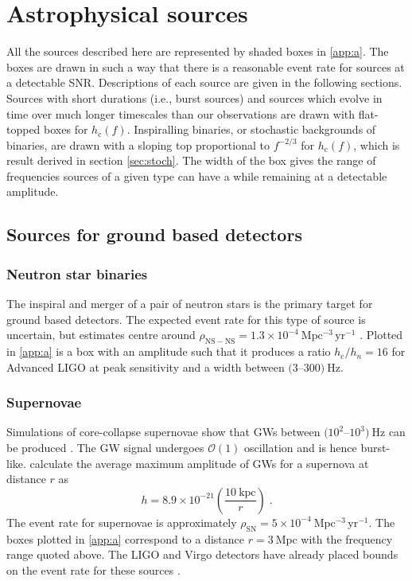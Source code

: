 \section{Astrophysical sources}\label{sec:sources}

All the sources described here are represented by shaded boxes in \ref{app:a}. The boxes are drawn in such a way that there is a reasonable event rate for sources at a detectable SNR. Descriptions of each source are given in the following sections. Sources with short durations (i.e., burst sources) and sources which evolve in time over much longer timescales than our observations are drawn with flat-topped boxes for $h_\mathrm{c}(f)$. Inspiralling binaries, or stochastic backgrounds of binaries, are drawn with a sloping top proportional to $f^{-2/3}$ for $h_\mathrm{c}(f)$, which is result derived in section \ref{sec:stoch}. The width of the box gives the range of frequencies sources of a given type can have a while remaining at a detectable amplitude.

\subsection{Sources for ground based detectors}

\subsubsection{Neutron star binaries}

The inspiral and merger of a pair of neutron stars is the primary target for ground based detectors. The expected event rate for this type of source is uncertain, but estimates centre around $\rho_{\mathrm{NS-NS}}=1.3\times 10^{-4}~\mathrm{Mpc^{-3}\,yr^{-1}}$ \citep{CBC}. Plotted in \ref{app:a} is a box with an amplitude such that it produces a ratio $h_\mathrm{c}/h_{n}=16$ for Advanced LIGO at peak sensitivity and a width between $(3$--$300)~\mathrm{Hz}$.

\subsubsection{Supernovae}

Simulations of core-collapse supernovae show that GWs between $(10^{2}$--$10^{3})~\mathrm{Hz}$ can be produced \citep{Kotake2006}. The GW signal undergoes ${\mathcal{O}}(1)$ oscillation and is hence burst-like. \citet{2002A&A...393..523D} calculate the average maximum amplitude of GWs for a supernova at distance $r$ as
\begin{equation}
h=8.9\times 10^{-21}\left( \frac{10~\mathrm{kpc}}{r} \right) \; .
\end{equation}
The event rate for supernovae is approximately $\rho_{\mathrm{SN}} = 5\times10^{-4}~\mathrm{Mpc^{-3}\,yr^{-1}}$. The boxes plotted in \ref{app:a} correspond to a distance $r=3~\mathrm{Mpc}$ with the frequency range quoted above. The LIGO and Virgo detectors have already placed bounds on the event rate for these sources \citep{Bursts}.

